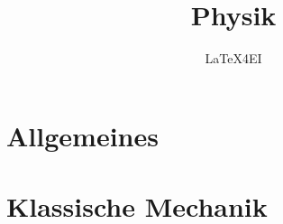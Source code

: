 \documentclass[german]{latex4ei/latex4ei_sheet}
\title{Physik}
\author{LaTeX4EI}                    %
\begin{document}
\maketitle   %


\section{Allgemeines}

\section{Klassische Mechanik}
\end{document}

